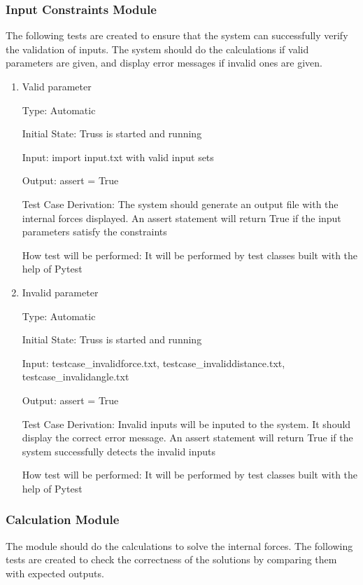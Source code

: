 \documentclass[12pt, titlepage]{article}
\begin{document}
\subsubsection{Input Constraints Module} \label{inConst}
The following tests are created to ensure that the system can successfully 
verify the validation of inputs. The system should do the calculations if valid 
parameters are given, and display error messages if invalid ones are given.

\begin{enumerate}

\item{Valid parameter\\}

Type: Automatic
					
Initial State: Truss is started and running
					
Input: import input.txt with valid input sets
					
Output: assert = True

Test Case Derivation: The system should generate an output file with the 
internal forces displayed. An assert statement will return True if the input 
parameters satisfy the constraints

How test will be performed: It will be performed by test classes built with the 
help of Pytest
					
\item{Invalid parameter\\}

Type: Automatic
					
Initial State: Truss is started and running
					
Input: testcase\_invalidforce.txt, testcase\_invaliddistance.txt, 
testcase\_invalidangle.txt
					
Output: assert = True

Test Case Derivation: Invalid inputs will be inputed to the system. It should 
display the correct error message. An assert statement will return True if the 
system successfully detects the invalid inputs 

How test will be performed: It will be performed by test classes built with the 
help of Pytest

\end{enumerate}

\subsubsection{Calculation Module} \label{calculation}
The module should do the calculations to solve the internal forces. The 
following tests are created to check the correctness of the solutions by 
comparing them with expected outputs. 
\end{document}

